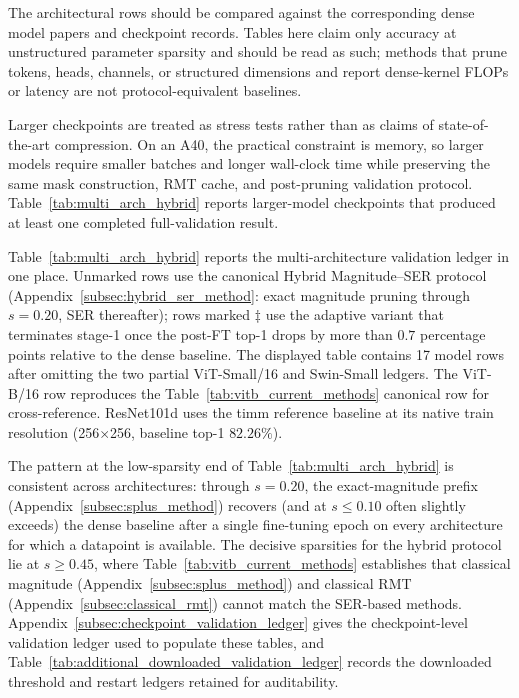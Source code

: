 \documentclass[11pt]{article}
\theoremstyle{plain}
\theoremstyle{definition}
\theoremstyle{remark}
\newcommand{\1}{\mathbf{1}}
\begin{document}
The architectural rows should be compared against the corresponding dense model papers and checkpoint records.  Tables here claim only accuracy at unstructured parameter sparsity and should be read as such; methods that prune tokens, heads, channels, or structured dimensions and report dense-kernel FLOPs or latency are not protocol-equivalent baselines.

Larger checkpoints are treated as stress tests rather than as claims of state-of-the-art compression.  On an A40, the practical constraint is memory, so larger models require smaller batches and longer wall-clock time while preserving the same mask construction, RMT cache, and post-pruning validation protocol.  Table~\ref{tab:multi_arch_hybrid} reports larger-model checkpoints that produced at least one completed full-validation result.

Table~\ref{tab:multi_arch_hybrid} reports the multi-architecture validation ledger in one place.  Unmarked rows use the canonical Hybrid Magnitude--SER protocol (Appendix~\ref{subsec:hybrid_ser_method}: exact magnitude pruning through \(s=0.20\), SER thereafter); rows marked \(\ddagger\) use the adaptive variant that terminates stage-1 once the post-FT top-1 drops by more than \(0.7\) percentage points relative to the dense baseline.  The displayed table contains 17 model rows after omitting the two partial ViT-Small/16 and Swin-Small ledgers.  The ViT-B/16 row reproduces the Table~\ref{tab:vitb_current_methods} canonical row for cross-reference.  ResNet101d uses the timm reference baseline at its native train resolution (256$\times$256, baseline top-1 \(82.26\%\)).

The pattern at the low-sparsity end of Table~\ref{tab:multi_arch_hybrid} is consistent across architectures: through \(s=0.20\), the exact-magnitude prefix (Appendix~\ref{subsec:splus_method}) recovers (and at \(s\le 0.10\) often slightly exceeds) the dense baseline after a single fine-tuning epoch on every architecture for which a datapoint is available.  The decisive sparsities for the hybrid protocol lie at \(s\ge 0.45\), where Table~\ref{tab:vitb_current_methods} establishes that classical magnitude (Appendix~\ref{subsec:splus_method}) and classical RMT (Appendix~\ref{subsec:classical_rmt}) cannot match the SER-based methods.  Appendix~\ref{subsec:checkpoint_validation_ledger} gives the checkpoint-level validation ledger used to populate these tables, and Table~\ref{tab:additional_downloaded_validation_ledger} records the downloaded threshold and restart ledgers retained for auditability.
\end{document}
